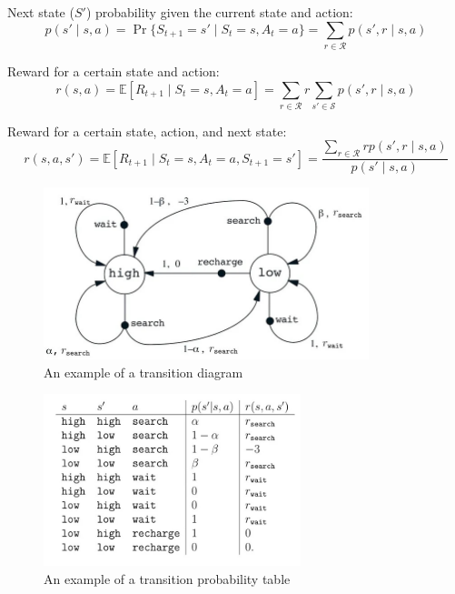 Next state ($S'$) probability given the current state and action:
\[
    p(s' \mid s, a) = \Pr\{S_{t+1} = s' \mid S_t = s, A_t = a\} = \sum_{r \in \mathcal{R}} p(s', r \mid s, a)
\]

Reward for a certain state and action:
\[
    r(s, a) = \mathbb{E}[R_{t+1} \mid S_t = s, A_t = a] = \sum_{r \in \mathcal{R}} r \sum_{s' \in \mathcal{S}} p(s', r \mid s, a)
\]

Reward for a certain state, action, and next state:
\[
    r(s, a, s') = \mathbb{E}[R_{t+1} \mid S_t = s, A_t = a, S_{t+1} = s'] = \frac{\sum_{r \in \mathcal{R}} r p(s', r \mid s, a)}{p(s' \mid s, a)}
\]

\begin{table}[H]
    \centering
    \begin{minipage}{0.35\linewidth}
        \begin{figure}[H]
            \includegraphics[height=5cm]{Pictures/deep-reinforcement-learning/eg1_mdp_fig.jpg}
            \caption{An example of a transition diagram}
        \end{figure}
    \end{minipage}
    \hfill
    \begin{minipage}{0.35\linewidth}
        \begin{figure}[H]
            \includegraphics[height=5cm]{Pictures/deep-reinforcement-learning/eg1_mdp_table.jpg}
            \caption{An example of a transition probability table}
        \end{figure}
    \end{minipage}
\end{table}

